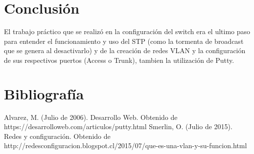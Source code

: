 \documentclass{article}
\begin{document}
\newpage

\section{Conclusión}
El trabajo práctico que se realizó en la configuración del switch era el ultimo paso para entender el funcionamiento y uso del STP (como la tormenta de broadcast que se genera al desactivarlo) y de la creación de redes VLAN y la configuración de sus respectivos puertos (Access o Trunk), tambien la utilización de Putty.

\newpage

\section{Bibliografía}
Alvarez, M. (Julio de 2006). Desarrollo Web. Obtenido de https://desarrolloweb.com/articulos/putty.html
Smerlin, O. (Julio de 2015). Redes y configuración. Obtenido de http://redesconfiguracion.blogspot.cl/2015/07/que-es-una-vlan-y-su-funcion.html
\end{document}
